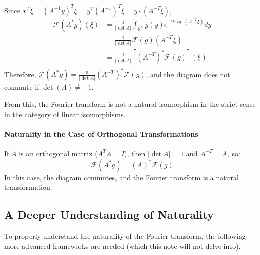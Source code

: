 \documentclass[uplatex,a4j,12pt,dvipdfmx]{jsarticle}
\begin{document}
Since $x^T \xi = (A^{-1}y)^T \xi = y^T (A^{-1})^T \xi = y \cdot (A^{-T}\xi)$,
\begin{align*}
	\mathcal{F}(A^* g)(\xi) & = \frac{1}{|\det A|} \int_{\mathbb{R}^n} g(y) e^{-2\pi i y \cdot (A^{-T}\xi)} dy \\
	                        & = \frac{1}{|\det A|} \mathcal{F}(g)(A^{-T}\xi)                                   \\
	                        & = \frac{1}{|\det A|} \left[(A^{-T})^*\mathcal{F}(g)\right](\xi)
\end{align*}
Therefore, $\mathcal{F}(A^*g) = \frac{1}{|\det A|}(A^{-T})^*\mathcal{F}(g)$, and the diagram does not commute if $\det(A) \neq \pm 1$.

From this, the Fourier transform is not a natural isomorphism in the strict sense in the category of linear isomorphisms.


\paragraph{Naturality in the Case of Orthogonal Transformations}
If $A$ is an orthogonal matrix ($A^T A = I$), then $|\det A| = 1$ and $A^{-T} = A$, so:
\[
	\mathcal{F}(A^*g) = (A)^*\mathcal{F}(g)
\]
In this case, the diagram commutes, and the Fourier transform is a natural transformation.



\subsection{A Deeper Understanding of Naturality}

To properly understand the naturality of the Fourier transform, the following more advanced frameworks are needed (which this note will not delve into).
\end{document}
